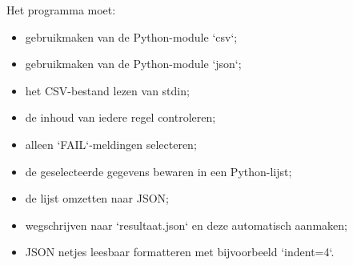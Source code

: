Het programma moet:
\begin{itemize}
\item gebruikmaken van de Python-module `csv`;
\item gebruikmaken van de Python-module `json`;
\item het CSV-bestand lezen van stdin;
\item de inhoud van iedere regel controleren;
\item alleen `FAIL`-meldingen selecteren;
\item de geselecteerde gegevens bewaren in een Python-lijst;
\item de lijst omzetten naar JSON;
\item wegschrijven naar `resultaat.json` en deze automatisch aanmaken;
\item JSON netjes leesbaar formatteren met bijvoorbeeld `indent=4`.
\end{itemize}

